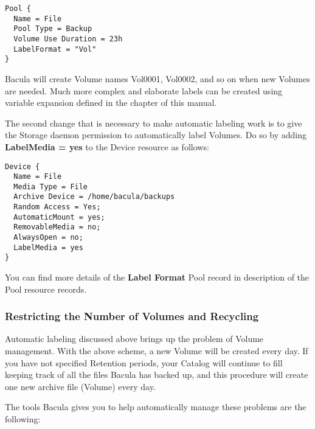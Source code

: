 \footnotesize
\begin{verbatim}
Pool {
  Name = File
  Pool Type = Backup
  Volume Use Duration = 23h
  LabelFormat = "Vol"
}
\end{verbatim}
\normalsize

Bacula will create Volume names Vol0001, Vol0002, and so on when new Volumes
are needed. Much more complex and elaborate labels can be created using
variable expansion defined in the 
 chapter of this manual. 

The second change that is necessary to make automatic labeling work is to give
the Storage daemon permission to automatically label Volumes. Do so by adding
{\bf LabelMedia = yes} to the Device resource as follows: 

\footnotesize
\begin{verbatim}
Device {
  Name = File
  Media Type = File
  Archive Device = /home/bacula/backups
  Random Access = Yes;
  AutomaticMount = yes;
  RemovableMedia = no;
  AlwaysOpen = no;
  LabelMedia = yes
}
\end{verbatim}
\normalsize

You can find more details of the {\bf Label Format} Pool record in 
 description of the Pool resource
records. 
\label{Recycling1}

\subsubsection*{Restricting the Number of Volumes and Recycling}

Automatic labeling discussed above brings up the problem of Volume management.
With the above scheme, a new Volume will be created every day. If you have not
specified Retention periods, your Catalog will continue to fill keeping track
of all the files Bacula has backed up, and this procedure will create one new
archive file (Volume) every day. 

The tools Bacula gives you to help automatically manage these problems are the
following: 

